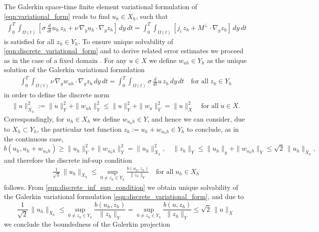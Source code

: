 \documentclass[12pt]{article}
\numberwithin{equation}{section}
\begin{document}
The Galerkin space-time finite element variational formulation of
\eqref{eqn:variational_form} reads to find $u_h \in X_h$, such that
\begin{align}\label{eqn:discrete_variational_form}
  \int_0^T \int_{\Omega(t)} \left[ \sigma \, \frac{d}{dt}u_h \, z_h
  + \nu \, \nabla_y u_h \cdot \nabla_y z_h \right] \, dy \, dt =
  \int_0^T \int_{\Omega(t)} \left[ j_i \, z_h + M^\perp \cdot \nabla_y z_h \right]
  \, dy \, dt
\end{align}
is satisfied for all $z_h \in Y_h$. To ensure unique solvability of
\eqref{eqn:discrete_variational_form} and to derive related error
estimates we proceed as in the case of a fixed domain \cite{St15}.
For any $u \in X$ we define $w_{uh} \in Y_h$ as the unique solution of the
Galerkin variational formulation
\begin{align}\label{eqn:discrete_auxiliary_variational_form}
  \int_0^T \int_{\Omega(t)} \nu \, \nabla_y w_{uh} \cdot \nabla_y z_h \, dy \, dt
  = \int_0^T \int_{\Omega(t)} \sigma \, \frac{d}{dt} u \, z_h \, dy \, dt
  \quad \mbox{for all} \; z_h \in Y_h
\end{align}
in order to define the discrete norm
\begin{align}\label{eqn:discrete_norm_of_X}
  \| u \|^2_{X_h} := \| u \|^2_Y + \| w_{uh}\|^2_Y \leq
  \| u \|^2_Y + \| w_u \|^2_Y = \|u \|^2_X \quad \mbox{for all} \; u \in X.
\end{align}
Correspondingly, for $u_h \in X_h$ we define $ w_{u_hh} \in Y$, and hence
we can consider, due to $X_h \subset Y_h$, the particular test function
$ z_h := u_h + w_{u_hh} \in Y_h$ to conclude, as in the continuous case,
\[
  b(u_h,u_h+w_{u_hh}) \geq
  \| u_h \|_Y^2 + \| w_{u_hh} \|^2_Y = \| u_h \|^2_{X_h},
  \quad
  \| z_h \|_Y \leq \| u_h \|_y + \| w_{u_hh} \|_Y \leq \sqrt{2} \,
  \| u_h \|_{X_h},
\]
and therefore the discrete inf-sup condition
\begin{align}\label{eqn:discrete_inf_sup_condition}
  \frac{1}{\sqrt{2}} \, \| u_h \|_{X_h} \leq \sup
  \limits_{0 \neq z_h \in Y_h} \frac{b(u_h,z_h)}{\|z_h\|_Y} \quad
  \mbox{for all} \; u_h \in X_h
\end{align}
follows. From \eqref{eqn:discrete_inf_sup_condition} we obtain unique
solvability of the Galerkin variational formulation 
\eqref{eqn:discrete_variational_form}, and due to
\[
  \frac{1}{\sqrt{2}} \, \| u_h \|_{X_h} \leq \sup
  \limits_{0 \neq z_h \in Y_h} \frac{b(u_h,z_h)}{\|z_h\|_Y} =
  \sup \limits_{0 \neq z_h \in Y_h} \frac{b(u,z_h)}{\|z_h\|_Y} 
  \leq \sqrt{2} \, \| u \|_X
\]
we conclude the boundedness of the Galerkin projection
\end{document}
